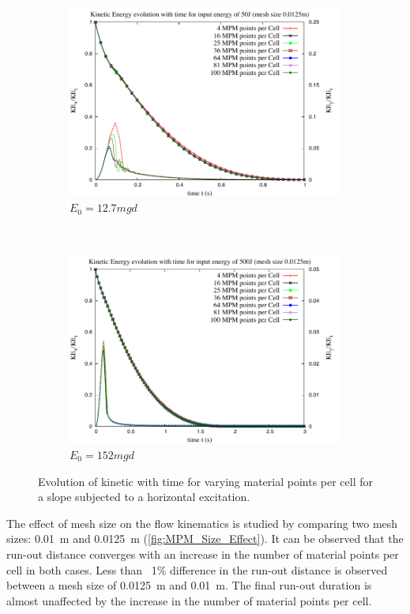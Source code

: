 \begin{figure}[tbhp]
\centering
\begin{subfigure}[b]{0.95\textwidth}
\includegraphics[width=\textwidth]{KE_50}
\caption{$E_0=12.7mgd$}
\label{fig:KE_50}
\end{subfigure}
\\
\begin{subfigure}[b]{0.95\textwidth}
\centering
\includegraphics[width=\textwidth]{KE_500}
\caption{$E_0=152mgd$}
\label{fig:KE_500}
\end{subfigure}
\caption{Evolution of kinetic with time for varying material points per cell 
for a slope subjected to a horizontal excitation.}
\label{fig:KE_MPM}
\end{figure}

The effect of mesh size on the flow kinematics is studied by comparing two mesh 
sizes: 0.01~\si{\m} and 0.0125~\si{\m} (\cref{fig:MPM_Size_Effect}). It can 
be observed that the run-out distance converges with an increase in the number 
of material points per cell in both cases. Less than ~1\% difference in the 
run-out distance is observed between a mesh size of 0.0125~\si{\m} and 
0.01~\si{\m}. The final run-out duration is almost unaffected by the increase 
in the number of material points per cell. 
 

